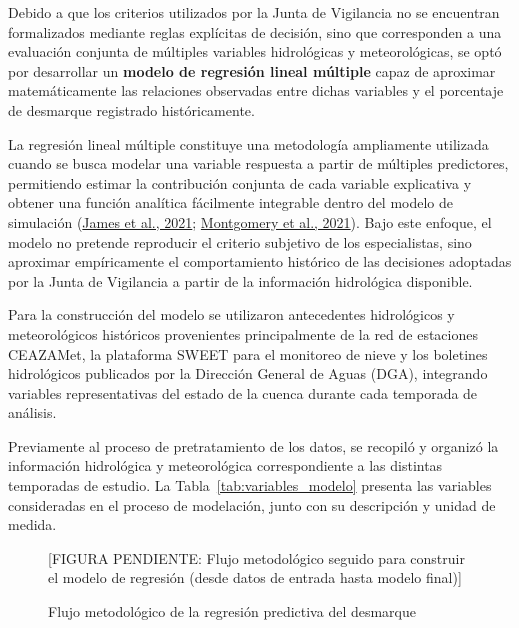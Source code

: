\documentclass[12pt]{report}
\newcommand{\citeref}[2]{\hyperlink{ref:#1}{#2}}
\begin{document}
Debido a que los criterios utilizados por la Junta de Vigilancia no se encuentran formalizados mediante reglas explícitas de decisión, sino que corresponden a una evaluación conjunta de múltiples variables hidrológicas y meteorológicas, se optó por desarrollar un \textbf{modelo de regresión lineal múltiple} capaz de aproximar matemáticamente las relaciones observadas entre dichas variables y el porcentaje de desmarque registrado históricamente. 

La regresión lineal múltiple constituye una metodología ampliamente utilizada cuando se busca modelar una variable respuesta a partir de múltiples predictores, permitiendo estimar la contribución conjunta de cada variable explicativa y obtener una función analítica fácilmente integrable dentro del modelo de simulación (\citeref{james2021}{James et al., 2021}; \citeref{montgomery2021}{Montgomery et al., 2021}). Bajo este enfoque, el modelo no pretende reproducir el criterio subjetivo de los especialistas, sino aproximar empíricamente el comportamiento histórico de las decisiones adoptadas por la Junta de Vigilancia a partir de la información hidrológica disponible.

Para la construcción del modelo se utilizaron antecedentes hidrológicos y meteorológicos históricos provenientes principalmente de la red de estaciones CEAZAMet, la plataforma SWEET para el monitoreo de nieve y los boletines hidrológicos publicados por la Dirección General de Aguas (DGA), integrando variables representativas del estado de la cuenca durante cada temporada de análisis.

Previamente al proceso de pretratamiento de los datos, se recopiló y organizó la información hidrológica y meteorológica correspondiente a las distintas temporadas de estudio. La Tabla~\ref{tab:variables_modelo} presenta las variables consideradas en el proceso de modelación, junto con su descripción y unidad de medida.

\begin{figure}[H]
    \centering
    \vspace{0.3cm}
    [FIGURA PENDIENTE: Flujo metodológico seguido para construir el modelo de regresión (desde datos de entrada hasta modelo final)]
    \caption{Flujo metodológico de la regresión predictiva del desmarque}
    \label{fig:flujo_desmarque}
\end{figure}

\vspace{0.2cm} 
\end{document}
